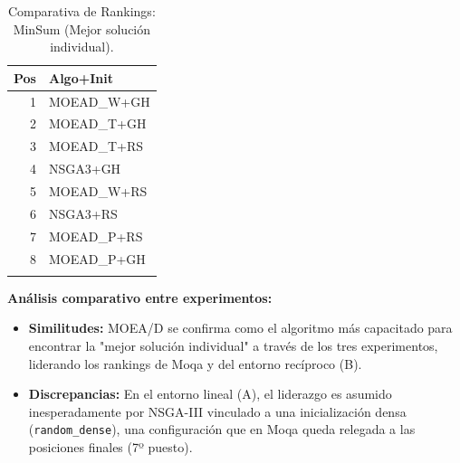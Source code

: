\documentclass[a4paper,10pt]{article}
\begin{document}
\begin{table}[H]
\begin{minipage}[t]{0.32\textwidth}
        \begin{tabular}{rl}
            \toprule
            Pos & Algo+Init \\ \midrule
            1 & MOEAD\_W+GH \\
            2 & MOEAD\_T+GH \\
            3 & MOEAD\_T+RS \\
            4 & NSGA3+GH \\
            5 & MOEAD\_W+RS \\
            6 & NSGA3+RS \\
            7 & MOEAD\_P+RS \\
            8 & MOEAD\_P+GH \\
            \\
            \bottomrule
        \end{tabular}
    \end{minipage}
    \caption{Comparativa de Rankings: MinSum (Mejor solución individual).}
\end{table}

\textbf{Análisis comparativo entre experimentos:}
\begin{itemize}
    \item \textbf{Similitudes:} MOEA/D se confirma como el algoritmo más capacitado para encontrar la "mejor solución individual" a través de los tres experimentos, liderando los rankings de Moqa y del entorno recíproco (B).
    \item \textbf{Discrepancias:} En el entorno lineal (A), el liderazgo es asumido inesperadamente por NSGA-III vinculado a una inicialización densa (\texttt{random\_dense}), una configuración que en Moqa queda relegada a las posiciones finales (7º puesto).
\end{itemize}
\end{document}

